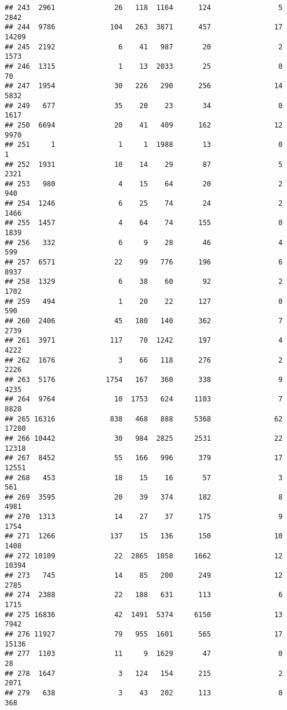 \documentclass[
]{article}
\begin{document}
\begin{verbatim}
## 243  2961              26   118  1164      124                5  2842
## 244  9786             104   263  3871      457               17 14209
## 245  2192               6    41   987       20                2  1573
## 246  1315               1    13  2033       25                0    70
## 247  1954              30   226   290      256               14  5832
## 249   677              35    20    23       34                0  1617
## 250  6694              20    41   409      162               12  9970
## 251     1               1     1  1988       13                0     1
## 252  1931              10    14    29       87                5  2321
## 253   980               4    15    64       20                2   940
## 254  1246               6    25    74       24                2  1466
## 255  1457               4    64    74      155                0  1839
## 256   332               6     9    28       46                4   599
## 257  6571              22    99   776      196                6  8937
## 258  1329               6    38    60       92                2  1702
## 259   494               1    20    22      127                0   590
## 260  2406              45   180   140      362                7  2739
## 261  3971             117    70  1242      197                4  4222
## 262  1676               3    66   118      276                2  2226
## 263  5176            1754   167   360      338                9  4235
## 264  9764              10  1753   624     1103                7  8828
## 265 16316             838   468   888     5368               62 17280
## 266 10442              30   984  2825     2531               22 12318
## 267  8452              55   166   996      379               17 12551
## 268   453              18    15    16       57                3   561
## 269  3595              20    39   374      182                8  4981
## 270  1313              14    27    37      175                9  1754
## 271  1266             137    15   136      150               10  1408
## 272 10109              22  2865  1058     1662               12 10394
## 273   745              14    85   200      249               12  2785
## 274  2388              22   188   631      113                6  1715
## 275 16836              42  1491  5374     6150               13  7942
## 276 11927              79   955  1601      565               17 15136
## 277  1103              11     9  1629       47                0    28
## 278  1647               3   124   154      215                2  2071
## 279   638               3    43   202      113                0   368

\end{verbatim}
\end{document}
